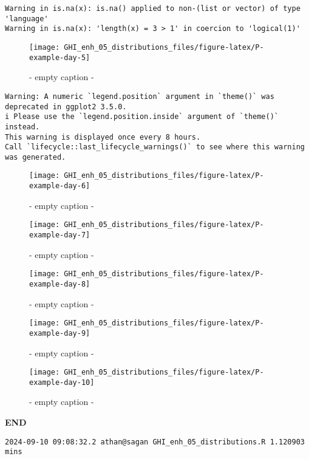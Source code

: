 \documentclass[
  10pt,
  a4paper,oneside]{article}
\begin{document}
\begin{verbatim}
Warning in is.na(x): is.na() applied to non-(list or vector) of type 'language'
Warning in is.na(x): 'length(x) = 3 > 1' in coercion to 'logical(1)'
\end{verbatim}

\begin{figure}[H]

{\centering \texttt{[image: GHI\_enh\_05\_distributions\_files/figure-latex/P-example-day-5]} 

}

\caption{ - empty caption - }\label{fig:P-example-day-5}
\end{figure}

\begin{verbatim}
Warning: A numeric `legend.position` argument in `theme()` was deprecated in ggplot2 3.5.0.
i Please use the `legend.position.inside` argument of `theme()` instead.
This warning is displayed once every 8 hours.
Call `lifecycle::last_lifecycle_warnings()` to see where this warning was generated.
\end{verbatim}

\begin{figure}[H]

{\centering \texttt{[image: GHI\_enh\_05\_distributions\_files/figure-latex/P-example-day-6]} 

}

\caption{ - empty caption - }\label{fig:P-example-day-6}
\end{figure}
\begin{figure}[H]

{\centering \texttt{[image: GHI\_enh\_05\_distributions\_files/figure-latex/P-example-day-7]} 

}

\caption{ - empty caption - }\label{fig:P-example-day-7}
\end{figure}
\begin{figure}[H]

{\centering \texttt{[image: GHI\_enh\_05\_distributions\_files/figure-latex/P-example-day-8]} 

}

\caption{ - empty caption - }\label{fig:P-example-day-8}
\end{figure}
\begin{figure}[H]

{\centering \texttt{[image: GHI\_enh\_05\_distributions\_files/figure-latex/P-example-day-9]} 

}

\caption{ - empty caption - }\label{fig:P-example-day-9}
\end{figure}
\begin{figure}[H]

{\centering \texttt{[image: GHI\_enh\_05\_distributions\_files/figure-latex/P-example-day-10]} 

}

\caption{ - empty caption - }\label{fig:P-example-day-10}
\end{figure}

\textbf{END}

\begin{verbatim}
2024-09-10 09:08:32.2 athan@sagan GHI_enh_05_distributions.R 1.120903 mins
\end{verbatim}
\end{document}
